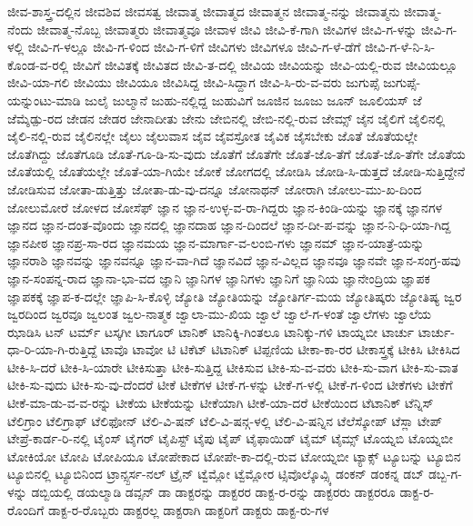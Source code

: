 {ಜೀವ-ಶಾಸ್ತ್ರ-ದಲ್ಲಿನ
ಜೀವಶಿವ
ಜೀವಸತ್ವ
ಜೀವಾತ್ಮ
ಜೀವಾತ್ಮದ
ಜೀವಾತ್ಮನ
ಜೀವಾತ್ಮ-ನನ್ನು
ಜೀವಾತ್ಮನು
ಜೀವಾತ್ಮ-ನೆಂದು
ಜೀವಾತ್ಮ-ನೊಬ್ಬ
ಜೀವಾತ್ಮರು
ಜೀವಾತ್ಮವೂ
ಜೀವಾಳ
ಜೀವಿ
ಜೀವಿ-ಕೆ-ಗಾಗಿ
ಜೀವಿಗಳ
ಜೀವಿ-ಗ-ಳನ್ನು
ಜೀವಿ-ಗ-ಳಲ್ಲಿ
ಜೀವಿ-ಗ-ಳಲ್ಲೂ
ಜೀವಿ-ಗ-ಳಿಂದ
ಜೀವಿ-ಗ-ಳಿಗೆ
ಜೀವಿಗಳು
ಜೀವಿಗಳೂ
ಜೀವಿ-ಗ-ಳೆ-ಡೆಗೆ
ಜೀವಿ-ಗ-ಳೆ-ನಿ-ಸಿ-ಕೊಂಡ-ವ-ರಲ್ಲಿ
ಜೀವಿಗೆ
ಜೀವಿತಕ್ಕೆ
ಜೀವಿತದ
ಜೀವಿ-ತ-ದಲ್ಲಿ
ಜೀವಿಯ
ಜೀವಿಯನ್ನು
ಜೀವಿ-ಯಲ್ಲಿ-ರುವ
ಜೀವಿಯಲ್ಲೂ
ಜೀವಿ-ಯಾ-ಗಲಿ
ಜೀವಿಯು
ಜೀವಿಯೂ
ಜೀವಿಸಿದ್ದ
ಜೀವಿ-ಸಿದ್ದಾಗ
ಜೀವಿ-ಸಿ-ರು-ವ-ವರು
ಜುಗುಪ್ಸೆ
ಜುಗುಪ್ಸೆ-ಯನ್ನುಂಟು-ಮಾಡಿ
ಜುಲೈ
ಜುಲ್ಮಾನೆ
ಜುಹು-ನಲ್ಲಿದ್ದ
ಜುಹುವಿಗೆ
ಜೂಜಿನ
ಜೂಜು
ಜೂನ್
ಜೂಲಿಯಸ್
ಜೆ
ಜೆಮ್ಶೆಡ್ಪು-ರದ
ಜೇಡನ
ಜೇಡರ
ಜೇನಾದೀತು
ಜೇನು
ಜೇಬಿನಲ್ಲಿ
ಜೇಬಿ-ನಲ್ಲಿ-ರುವ
ಜೇಮ್ಸ್
ಜೈನ
ಜೈಲಿಗೆ
ಜೈಲಿನಲ್ಲಿ
ಜೈಲಿ-ನಲ್ಲಿ-ರುವ
ಜೈಲಿನಲ್ಲೇ
ಜೈಲು
ಜೈಲುವಾಸ
ಜೈವ
ಜೈವಸ್ರೋತ
ಜೈವಿಕ
ಜೈಸಬೇಕು
ಜೊತೆ
ಜೊತೆಯಲ್ಲೇ
ಜೊತೆಗಿದ್ದು
ಜೊತೆಗೂಡಿ
ಜೊತೆ-ಗೂ-ಡಿ-ಸು-ವುದು
ಜೊತೆಗೆ
ಜೊತೆಗೇ
ಜೊತೆ-ಜೊ-ತೆಗೆ
ಜೊತೆ-ಜೊ-ತೆಗೇ
ಜೊತೆಯ
ಜೊತೆಯಲ್ಲಿ
ಜೊತೆಯಲ್ಲೇ
ಜೊತೆ-ಯಾ-ಗಿಯೇ
ಜೋಕೆ
ಜೋಗದಲ್ಲಿ
ಜೋಡಿಸಿ
ಜೋಡಿ-ಸಿ-ಡುತ್ತದೆ
ಜೋಡಿ-ಸುತ್ತಿದ್ದೇನೆ
ಜೋಡಿಸುವ
ಜೋತಾ-ಡುತ್ತಿತ್ತು
ಜೋತಾ-ಡು-ವು-ದನ್ನೂ
ಜೋನಾಥನ್
ಜೋರಾಗಿ
ಜೋಲು-ಮು-ಖ-ದಿಂದ
ಜೋಲುಮೋರೆ
ಜೋಳದ
ಜೋಸೆಫ್
ಜ್ಞಾನ
ಜ್ಞಾನ-ಉಳ್ಳ-ವ-ರಾ-ಗಿದ್ದರು
ಜ್ಞಾನ-ಕಿಂಡಿ-ಯನ್ನು
ಜ್ಞಾನಕ್ಕೆ
ಜ್ಞಾನಗಳ
ಜ್ಞಾನದ
ಜ್ಞಾನ-ದಂತ-ವೊಂದು
ಜ್ಞಾನದಲ್ಲಿ
ಜ್ಞಾನದಾಹ
ಜ್ಞಾನ-ದಿಂದಲೆ
ಜ್ಞಾನ-ದೀ-ಪ-ವನ್ನು
ಜ್ಞಾನ-ನಿ-ಧಿ-ಯಾ-ಗಿದ್ದ
ಜ್ಞಾನಪೀಠ
ಜ್ಞಾನಪ್ರ-ಸಾ-ರದ
ಜ್ಞಾನಮಯ
ಜ್ಞಾನ-ಮಾರ್ಗಾ-ವ-ಲಂಬಿ-ಗಳು
ಜ್ಞಾನಮ್
ಜ್ಞಾನ-ಯಾತ್ರೆ-ಯನ್ನು
ಜ್ಞಾನರಾಶಿ
ಜ್ಞಾನವನ್ನು
ಜ್ಞಾನವನ್ನೂ
ಜ್ಞಾನ-ವಾ-ಗಿದೆ
ಜ್ಞಾನವಿದೆ
ಜ್ಞಾನ-ವಿಲ್ಲದ
ಜ್ಞಾನವೂ
ಜ್ಞಾನವೇ
ಜ್ಞಾನ-ಸಂಗ್ರ-ಹವು
ಜ್ಞಾನ-ಸಂಪನ್ನ-ರಾದ
ಜ್ಞಾನಾ-ಭಾ-ವದ
ಜ್ಞಾನಿ
ಜ್ಞಾನಿಗಳ
ಜ್ಞಾನಿಗಳು
ಜ್ಞಾನಿಗೆ
ಜ್ಞಾನಿಯ
ಜ್ಞಾನೇಂದ್ರಿಯ
ಜ್ಞಾಪಕ
ಜ್ಞಾಪಕಕ್ಕೆ
ಜ್ಞಾಪ-ಕ-ದಲ್ಲೇ
ಜ್ಞಾಪಿ-ಸಿ-ಕೊಳ್ಳಿ
ಜ್ಯೋತಿ
ಜ್ಯೋತಿಯನ್ನು
ಜ್ಯೋತಿರ್ಗ-ಮಯ
ಜ್ಯೋತಿಷ್ಕರು
ಜ್ಯೋತಿಷ್ಯ
ಜ್ವರ
ಜ್ವರದಿಂದ
ಜ್ವರವೂ
ಜ್ವಲಂತ
ಜ್ವಲ-ನಾತ್ಮಕ
ಜ್ವಾಲಾ-ಮು-ಖಿಯ
ಜ್ವಾಲೆ
ಜ್ವಾಲೆ-ಗ-ಳಂತೆ
ಜ್ವಾಲೆಗಳು
ಜ್ವಾಲೆಯ
ಝಾಡಿಸಿ
ಟನ್
ಟರ್ಮ್
ಟಸ್ಕಗೀ
ಟಾಗೂರ್
ಟಾನಿಕ್
ಟಾನಿಕ್ಕಿ-ಗಿಂತಲೂ
ಟಾನಿಕ್ಕು-ಗಳಿ
ಟಾಯ್ನಬೀ
ಟಾರ್ಚು
ಟಾರ್ಚು-ಧಾ-ರಿ-ಯಾ-ಗಿ-ರುತ್ತಿದ್ದೆ
ಟಾವೊ
ಟಾವೋ
ಟಿ
ಟಿಕೆಟ್
ಟಿಟಾನಿಕ್
ಟಿಪ್ಪಣಿಯ
ಟೀಕಾ-ಕಾ-ರರ
ಟೀಕಾಸ್ತ್ರಕ್ಕೆ
ಟೀಕಿಸಿ
ಟೀಕಿಸಿದ
ಟೀಕಿ-ಸಿ-ದರೆ
ಟೀಕಿ-ಸಿ-ಯಾರೇ
ಟೀಕಿಸುತ್ತಾ
ಟೀಕಿ-ಸುತ್ತಿದ್ದ
ಟೀಕಿಸುವ
ಟೀಕಿ-ಸು-ವ-ವರು
ಟೀಕಿ-ಸು-ವಾಗ
ಟೀಕಿ-ಸು-ವಾತ
ಟೀಕಿ-ಸು-ವುದು
ಟೀಕಿ-ಸು-ವು-ದೆಂದರೆ
ಟೀಕೆ
ಟೀಕೆಗಳ
ಟೀಕೆ-ಗ-ಳನ್ನು
ಟೀಕೆ-ಗ-ಳಲ್ಲಿ
ಟೀಕೆ-ಗ-ಳಿಂದ
ಟೀಕೆಗಳು
ಟೀಕೆಗೆ
ಟೀಕೆ-ಮಾ-ಡು-ವ-ವ-ರನ್ನು
ಟೀಕೆಯ
ಟೀಕೆಯನ್ನು
ಟೀಕೆಯಾಗಿ
ಟೀಕೆ-ಯಾ-ದರೆ
ಟೀಕೆಯಿಂದ
ಟೆಟಾನಿಕ್
ಟೆನ್ನಿಸ್
ಟೆಲಿಗ್ರಾಂ
ಟೆಲಿಗ್ರಾಫ್
ಟೆಲಿಫೋನ್
ಟೆಲಿ-ವಿ-ಷನ್
ಟೆಲಿ-ವಿ-ಷನ್ಗ-ಳಲ್ಲಿ
ಟೆಲಿ-ವಿ-ಷನ್ನಿನ
ಟೆಲೆಸ್ಕೋಪ್
ಟೆಸ್ಲಾ
ಟೇಪ್
ಟೇಪ್ರೆ-ಕಾರ್ಡ-ರಿ-ನಲ್ಲಿ
ಟೈಂಸ್
ಟೈಗರ್
ಟೈಪಿಸ್ಟ್
ಟೈಪು
ಟೈಪ್
ಟೈಫಾಯಿಡ್
ಟೈಮ್
ಟೈಮ್ಸ್
ಟೊಯ್ನಬಿ
ಟೊಯ್ನಬೀ
ಟೋಕಿಯೋ
ಟೋಪಿ
ಟೋಪಿಯೂ
ಟೋಪೇಕಾದ
ಟೋಪೇ-ಕಾ-ದಲ್ಲಿ-ರುವ
ಟೋಯ್ನಬೀ
ಟ್ಯಾಕ್ಸ್
ಟ್ಯೂಬನ್ನು
ಟ್ಯೂಬಿನ
ಟ್ಯೂಬಿನಲ್ಲಿ
ಟ್ಯೂಬಿನಿಂದ
ಟ್ರಾನ್ಸ್ಪರ್ಸ-ನಲ್
ಟ್ರೈನ್
ಟ್ವೆಮ್ಲೋ
ಟ್ವೆಮ್ಲೋರ
ಟ್ಸಿವೊಲ್ಕೊವ್ಸ್ಕಿ
ಡಂಕನ್
ಡಂಕನ್ನ
ಡಬ್
ಡಬ್ಬ-ಗ-ಳನ್ನು
ಡಬ್ಬಿಯಲ್ಲಿ
ಡಯಲ್ಮಾಡಿ
ಡವ್ಸನ್
ಡಾ
ಡಾಕ್ಟರನ್ನು
ಡಾಕ್ಟರರ
ಡಾಕ್ಟ-ರ-ರನ್ನು
ಡಾಕ್ಟರರು
ಡಾಕ್ಟರರೂ
ಡಾಕ್ಟ-ರ-ರೊಂದಿಗೆ
ಡಾಕ್ಟ-ರ-ರೊಬ್ಬರು
ಡಾಕ್ಟರಲ್ಲ
ಡಾಕ್ಟರಾಗಿ
ಡಾಕ್ಟರಿಗೆ
ಡಾಕ್ಟರು
ಡಾಕ್ಟ-ರು-ಗಳ
}
